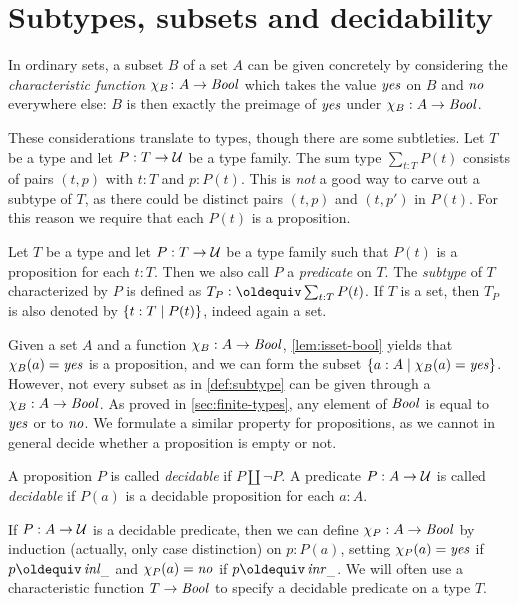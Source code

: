 \section{Subtypes, subsets and decidability}
\label{sec:subtype}

In ordinary sets, a subset $B$ of a set $A$ can be given concretely by 
considering the \emph{characteristic function} $\chi_B\colon A\to\mathop{\mathit{Bool}}$ 
which takes the value $\mathop{\mathit{yes}}$ on $B$ and $\mathop{\mathit{no}}$ everywhere else: 
$B$ is then exactly the preimage of $\mathop{\mathit{yes}}$ under $\chi_B: A\to\mathop{\mathit{Bool}}$.

These considerations translate to types, though there are some 
subtleties. Let $T$ be a type and let $P: T\to\mathcal{U}$ be a type family.
The sum type $\sum_{t:T} P(t)$ consists of pairs $(t,p)$ with
$t:T$ and $p:P(t)$. This is \emph{not} a good way to carve out a subtype
of $T$, as there could be distinct pairs $(t,p)$ and $(t,p')$ in $P(t)$.
For this reason we require that each $P(t)$ is a proposition.

\begin{definition}\label{def:subtype}
Let $T$ be a type and let $P: T\to\mathcal{U}$ be a type family such that
$P(t)$ is a proposition for each $t:T$. Then we also
call $P$ a \emph{predicate} on $T$.
The \emph{subtype} of $T$ characterized by $P$ is defined 
as $T_P\defeq \sum_{t:T} P(t)$.
If $T$ is a set, then $T_P$
is also denoted by $\{t:T \mid P(t)\}$, indeed again a set.
\end{definition}

Given a set $A$ and a function $\chi_B: A\to\mathop{\mathit{Bool}}$,
\cref{lem:isset-bool} yields that $\chi_B(a) = \mathop{\mathit{yes}}$ is a
proposition, and we can form
the subset $\{a:A \mid \chi_B(a) = \mathop{\mathit{yes}}\}$. However,
not every subset as in \cref{def:subtype} can be given
through a $\chi_B: A\to\mathop{\mathit{Bool}}$. As proved in \cref{sec:finite-types},
any element of $\mathop{\mathit{Bool}}$ is equal to $\mathop{\mathit{yes}}$ or to $\mathop{\mathit{no}}$.
We formulate a similar property for propositions,
as we cannot in general decide whether a proposition is empty or not.

\begin{definition}\label{def:decidability}
A proposition $P$ is called \emph{decidable} if $P\amalg\neg P$.
A predicate $P: A\to\mathcal{U}$ is called \emph{decidable} if 
$P(a)$ is a decidable proposition for each $a:A$.
\end{definition}

If $P: A\to\mathcal{U}$ is a decidable predicate, then
we can define $\chi_P: A\to\mathop{\mathit{Bool}}$ by induction (actually,
only case distinction) on $p:P(a)$, setting $\chi_P(a)=\mathop{\mathit{yes}}$
if $p\jdeq\inl{\_}$ and $\chi_P(a)=\mathop{\mathit{no}}$ if $p\jdeq\inr{\_}$.
We will often use a characteristic function $T\to\mathop{\mathit{Bool}}$ to
specify a decidable predicate on a type $T$.

